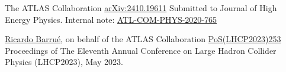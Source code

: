 
\begin{cventries}
    {The ATLAS Collaboration}{}
    {\href{https://arxiv.org/abs/2410.19611}{arXiv:2410.19611}}
    {
        Submitted to Journal of High Energy Physics. Internal note: \href{https://cds.cern.ch/record/2743096}{ATL-COM-PHYS-2020-765}
    }    
\end{cventries}




\begin{cventries}
    {\underline{Ricardo Barrué}, on behalf of the ATLAS Collaboration}{}
    {\href{https://pos.sissa.it/450/253/}{PoS(LHCP2023)253}}
    {
        Proceedings of The Eleventh Annual Conference on Large Hadron Collider Physics (LHCP2023), May 2023.
    }
\end{cventries}


